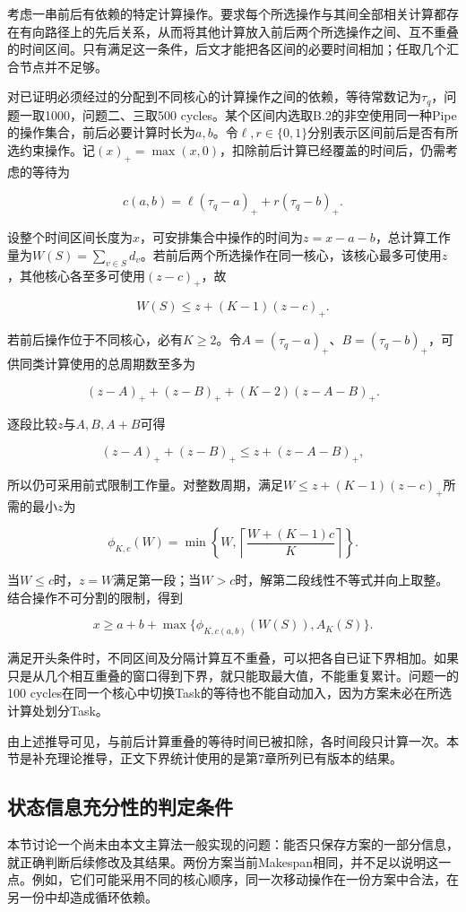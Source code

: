\documentclass[anonymous,notoc]{gmcm2026}
\begin{document}
考虑一串前后有依赖的特定计算操作。要求每个所选操作与其间全部相关计算都存在有向路径上的先后关系，从而将其他计算放入前后两个所选操作之间、互不重叠的时间区间。只有满足这一条件，后文才能把各区间的必要时间相加；任取几个汇合节点并不足够。

对已证明必须经过的分配到不同核心的计算操作之间的依赖，等待常数记为\(\tau_q\)，问题一取1000，问题二、三取500 cycles。某个区间内选取B.2的非空使用同一种Pipe的操作集合，前后必要计算时长为\(a,b\)。令\(\ell,r\in\{0,1\}\)分别表示区间前后是否有所选约束操作。记\((x)_+=\max(x,0)\)，扣除前后计算已经覆盖的时间后，仍需考虑的等待为

\[c(a,b)=\ell(\tau_q-a)_++r(\tau_q-b)_+.\]

设整个时间区间长度为\(x\)，可安排集合中操作的时间为\(z=x-a-b\)，总计算工作量为\(W(S)=\sum_{v\in S}d_v\)。若前后两个所选操作在同一核心，该核心最多可使用\(z\)，其他核心各至多可使用\((z-c)_+\)，故

\[W(S)\le z+(K-1)(z-c)_+.\]

若前后操作位于不同核心，必有\(K\ge2\)。令\(A=(\tau_q-a)_+\)、\(B=(\tau_q-b)_+\)，可供同类计算使用的总周期数至多为

\[(z-A)_++(z-B)_++(K-2)(z-A-B)_+.\]

逐段比较\(z\)与\(A,B,A+B\)可得

\[(z-A)_++(z-B)_+\le z+(z-A-B)_+,\]

所以仍可采用前式限制工作量。对整数周期，满足\(W\le z+(K-1)(z-c)_+\)所需的最小\(z\)为

\[\phi_{K,c}(W)=\min\left\{W,\left\lceil\frac{W+(K-1)c}{K}\right\rceil\right\}.\]

当\(W\le c\)时，\(z=W\)满足第一段；当\(W>c\)时，解第二段线性不等式并向上取整。结合操作不可分割的限制，得到

\[x\ge a+b+\max\{\phi_{K,c(a,b)}(W(S)),A_K(S)\}.\]

满足开头条件时，不同区间及分隔计算互不重叠，可以把各自已证下界相加。如果只是从几个相互重叠的窗口得到下界，就只能取最大值，不能重复累计。问题一的100 cycles在同一个核心中切换Task的等待也不能自动加入，因为方案未必在所选计算处划分Task。

由上述推导可见，与前后计算重叠的等待时间已被扣除，各时间段只计算一次。本节是补充理论推导，正文下界统计使用的是第7章所列已有版本的结果。

\subsection{状态信息充分性的判定条件}

本节讨论一个尚未由本文主算法一般实现的问题：能否只保存方案的一部分信息，就正确判断后续修改及其结果。两份方案当前Makespan相同，并不足以说明这一点。例如，它们可能采用不同的核心顺序，同一次移动操作在一份方案中合法，在另一份中却造成循环依赖。
\end{document}
